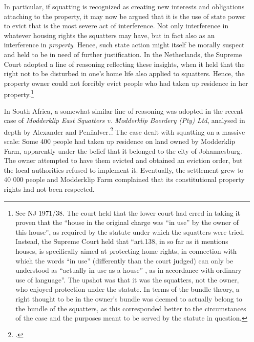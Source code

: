 In particular, if squatting is recognized as creating new interests and obligations attaching to the property, it may now be argued that  it is the use of state power to evict that is the most severe act of interference. Not only interference in whatever housing rights the squatters may have, but in fact also as an interference in {\it property}. Hence, such state action might itself be morally suspect and held to be in need of further justification. In the Netherlands, the Supreme Court adopted a line of reasoning reflecting these insights, when it held that the right not to be disturbed in one's home life also applied to squatters. Hence, the property owner could not forcibly evict people who had taken up residence in her property.\footnote{See NJ 1971/38. The court held that the lower court had erred in taking it proven that the ``house in the original charge was ``in use'' by the owner of this house'', as required by the statute under which the squatters were tried. Instead, the Supreme Court held that ``art.138, in so far as it mentions houses, is specifically aimed at protecting home rights, in connection with which the words ``in use'' (differently than the court judged) can only be understood as ``actually in use as a house'' , as in accordance with ordinary use of language''. The upshot was that it was the squatters, not the owner, who enjoyed protection under the statute. In terms of the bundle theory, a right thought to be in the owner's bundle was deemed to actually belong to the bundle of the squatters, as this corresponded better to the circumstances of the case and the purposes meant to be served by the statute in question.}

In South Africa, a somewhat similar line of reasoning was adopted in the recent case of {\it Modderklip East Squatters v. Modderklip Boerdery (Pty) Ltd}, analysed in depth by Alexander and Pen\~{n}alver.\footcite[154-160]{alexander11} The case dealt with squatting on a massive scale: Some 400 people had taken up residence on land owned by Modderklip Farm, apparently under the belief that it belonged to the city of Johannesburg. The owner attempted to have them evicted and obtained an eviction order, but the local authorities refused to implement it. Eventually, the settlement grew to 40 000 people and Modderklip Farm complained that its constitutional property rights had not been respected.

